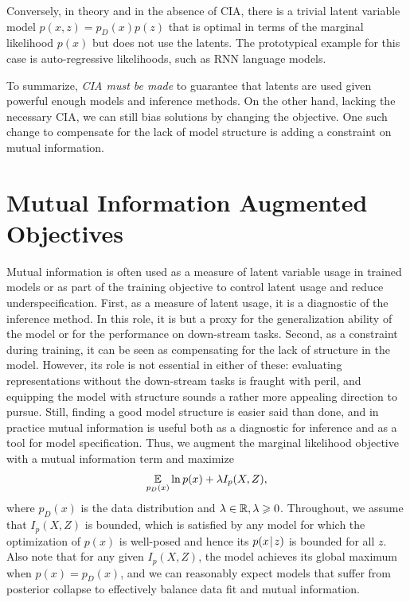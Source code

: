 Conversely, in theory and in the absence of CIA, there is a trivial latent variable model $p(x,z)=p_D(x)p(z)$ that is optimal in terms of the marginal likelihood $p(x)$ but does not use the latents.
The prototypical example for this case is auto-regressive likelihoods, such as RNN language models.

To summarize, \emph{CIA must be made} to guarantee that latents are used given powerful enough models and inference methods.
On the other hand, lacking the necessary CIA, we can still bias solutions by changing the objective.
One such change to compensate for the lack of model structure is adding a constraint on mutual information.

\section{Mutual Information Augmented Objectives}
\label{sec:mi-objective}

Mutual information is often used as a measure of latent variable usage in trained models or as part of the training objective to control latent usage and reduce underspecification.
First, as a measure of latent usage, it is a diagnostic of the inference method.
In this role, it is but a proxy for the generalization ability of the model or for the performance on down-stream tasks.
Second, as a constraint during training, it can be seen as compensating for the lack of structure in the model.
However, its role is not essential in either of these: evaluating representations without the down-stream tasks is fraught with peril, and equipping the model with structure sounds a rather more appealing direction to pursue.
Still, finding a good model structure is easier said than done, and in practice mutual information is useful both as a diagnostic for inference and as a tool for model specification.
Thus, we augment the marginal likelihood objective with a mutual information term and maximize
\begin{align}
\label{eq:mi-obj}
\mathop{{}\mathbb{E}}_{p_D(x)}\ln p(x) + \lambda I_p(X,Z),
\end{align}
where $p_D(x)$ is the data distribution and $\lambda \in \mathbb{R}, \lambda
\geqslant 0$.
Throughout, we assume that $I_p(X,Z)$ is bounded, which is satisfied by any model for which the optimization of $p(x)$ is well-posed and hence its $p(x\hspace{0.08em}|\hspace{0.11em} z)$ is bounded for all $z$.
Also note that for any given $I_p(X,Z)$, the model achieves its global maximum when $p(x)=p_D(x)$, and we can reasonably expect models that suffer from posterior collapse to effectively balance data fit and mutual information.

